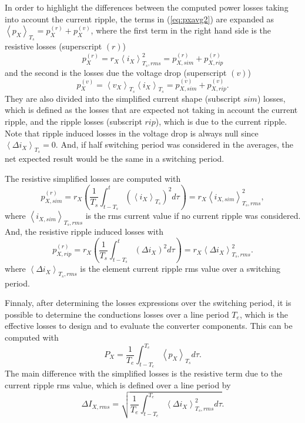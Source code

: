 \documentclass[10pt, onecolumn,conference]{IEEEtran}
\begin{document}
In order to highlight the differences between the computed power losses taking into account the current ripple, the terms in (\ref{eq:pxavg2}) are expanded as $\left\langle p_X \right\rangle_{T_s}\!=\!p^{(r)}_{X}\!+\!p^{(v)}_{X}$, where the first term in the right hand side is the resistive losses (superscript $(r)$)
%
\begin{equation}
p^{(r)}_{X}=r_X\left\langle i_X \right\rangle_{T_s,{rms}}^2=p^{(r)}_{X,sim}+p^{(r)}_{X,rip}
\end{equation} and the second is the losses due the voltage drop (superscript $(v)$)
%
\begin{equation}
p^{(v)}_{X}=\left\langle v_X \right\rangle_{T_s}\left\langle i_X \right\rangle_{T_s}=p^{(v)}_{X,sim}+p^{(v)}_{X,rip}.
\end{equation} They are also divided into the simplified current shape (subscript $sim$) losses, which is defined as the losses that are expected not taking in account the current ripple, and the ripple losses (subscript $rip$), which is due to the current ripple. Note that ripple induced losses in the voltage drop is always null since $\left\langle \Delta i_X \right\rangle_{T_s}\!=\!0$. And, if half switching period was considered in the averages, the net expected result would be the same in a switching period.

The resistive simplified losses are computed with
%
\begin{equation}
p^{(r)}_{X,sim}=r_X \left( \dfrac{1}{T_s} \int_{t-T_s}^{t} (\left\langle i_X \right\rangle_{T_s})^2d\tau \right)=r_X\left\langle  {i}_{X,sim} \right\rangle_{T_s,{rms}}^2,
\end{equation} where $\left\langle  {i}_{X,sim} \right\rangle_{T_s,{rms}}$ is the rms current value if no current ripple was considered. And, the resistive ripple induced losses with
%
\begin{equation}
\label{eq:pxrip}
p^{(r)}_{X,rip}=r_X \left( \dfrac{1}{T_s} \int_{t-T_s}^{t} (\Delta i_X)^2d\tau\right)=r_X \left\langle \Delta i_X \right\rangle_{T_s,{rms}}^2.
\end{equation} where $\left\langle \Delta i_X \right\rangle_{T_s,{rms}}$ is the element current ripple rms value over a switching period.

Finnaly, after determining the losses expressions over the switching period, it is possible to determine the conductions losses over a line period $T_e$, which is the effective losses to design and to evaluate the converter components. This can be computed with
%
\begin{equation}
P_X=\dfrac{1}{T_e}\int_{t-T_e}^{T_e}\left\langle p_X \right\rangle_{T_s} d\tau.
\end{equation} The main difference with the simplified losses is the resistive term due to the current ripple rms value, which is defined over a line period by
%
\begin{equation}
\Delta I_{X,{rms}}=\sqrt{\dfrac{1}{T_e}\int_{t-T_e}^{T_e} \left\langle \Delta i_X \right\rangle_{T_s,{rms}}^2 d\tau}.
\end{equation} 
\end{document}
